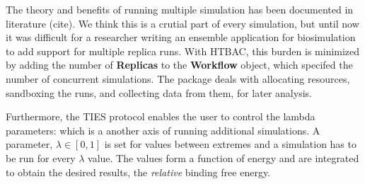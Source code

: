 The theory and benefits of  running multiple simulation has been documented
in literature (cite). We think this is a crutial part of every simulation,
but until now it was difficult for a researcher writing an ensemble
application for biosimulation to add support for multiple replica runs. With
HTBAC, this burden is minimized by adding the number of \textbf{Replicas} to
the \textbf{Workflow} object, which specifed the number of concurrent
simulations. The package deals with allocating resources, sandboxing the
runs, and collecting data from them, for later analysis.

Furthermore, the TIES protocol enables the user to control the lambda
parameters: which is a another axis of running additional simulations. A
parameter, $\lambda \in [0, 1]$ is set for values between extremes and a
simulation has to be run for every $\lambda$ value. The values form a
function of energy and are integrated to obtain the desired results, the
\emph{relative} binding free energy.








